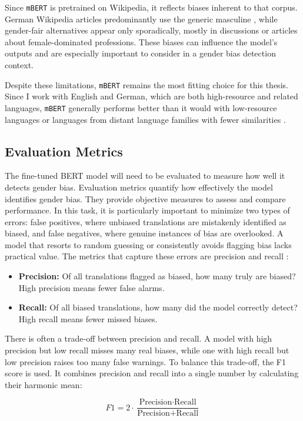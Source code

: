     Since \texttt{mBERT} is pretrained on Wikipedia, it reflects biases inherent to that corpus. German Wikipedia articles predominantly use the generic masculine \parencite{sichlerGenderDifferencesGermanlanguage2014}, while gender-fair alternatives appear only sporadically, mostly in discussions or articles about female-dominated professions. These biases can influence the model’s outputs and are especially important to consider in a gender bias detection context.

    Despite these limitations, \texttt{mBERT} remains the most fitting choice for this thesis. Since I work with English and German, which are both high-resource and related languages, \texttt{mBERT} generally performs better than it would with low-resource languages or languages from distant language families with fewer similarities \parencite{lauscherZeroHeroLimitations2020}.

\subsection{Evaluation Metrics}
    The fine-tuned BERT model will need to be evaluated to measure how well it detects gender bias. Evaluation metrics quantify how effectively the model identifies gender bias. They provide objective measures to assess and compare performance. In this task, it is particularly important to minimize two types of errors: false positives, where unbiased translations are mistakenly identified as biased, and false negatives, where genuine instances of bias are overlooked. A model that resorts to random guessing or consistently avoids flagging bias lacks practical value. The metrics that capture these errors are precision and recall \parencite{rainioEvaluationMetricsStatistical2024}:

\begin{itemize}
    \item \textbf{Precision:} Of all translations flagged as biased, how many truly are biased? High precision means fewer false alarms.
    \item \textbf{Recall:} Of all biased translations, how many did the model correctly detect? High recall means fewer missed biases.
\end{itemize}

There is often a trade-off between precision and recall. A model with high precision but low recall misses many real biases, while one with high recall but low precision raises too many false warnings. To balance this trade-off, the F1 score is used. It combines precision and recall into a single number by calculating their harmonic mean:

\[
F1 = 2 \cdot \frac{\text{Precision} \cdot \text{Recall}}{\text{Precision} + \text{Recall}}
\]
